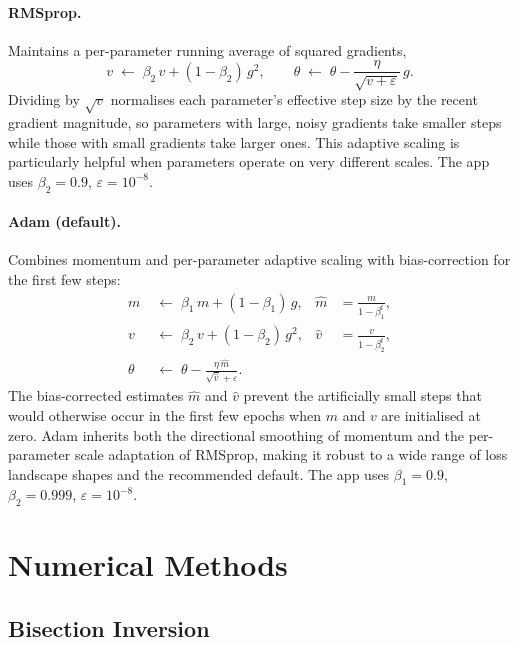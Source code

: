 \documentclass[11pt,a4paper]{article}
\newcommand{\param}{\theta}
\begin{document}
\paragraph{RMSprop.}
Maintains a per-parameter running average of squared gradients,
\begin{equation}
  v \;\leftarrow\; \beta_2\,v + (1-\beta_2)\,g^2,\qquad
  \param \;\leftarrow\; \param
         - \frac{\eta}{\sqrt{v+\varepsilon}}\,g.
\end{equation}
Dividing by $\sqrt{v}$ normalises each parameter's effective step size by
the recent gradient magnitude, so parameters with large, noisy gradients
take smaller steps while those with small gradients take larger ones.
This adaptive scaling is particularly helpful when parameters operate on
very different scales.  The app uses $\beta_2=0.9$, $\varepsilon=10^{-8}$.

\paragraph{Adam (default).}
Combines momentum and per-parameter adaptive scaling with
bias-correction for the first few steps:
\begin{align}
  m &\;\leftarrow\; \beta_1\,m + (1-\beta_1)\,g,&
  \hat m &= \frac{m}{1-\beta_1^t},\\
  v &\;\leftarrow\; \beta_2\,v + (1-\beta_2)\,g^2,&
  \hat v &= \frac{v}{1-\beta_2^t},\\
  \param &\;\leftarrow\; \param
         - \frac{\eta\,\hat m}{\sqrt{\hat v}+\varepsilon}.
\end{align}
The bias-corrected estimates $\hat m$ and $\hat v$ prevent the
artificially small steps that would otherwise occur in the first few
epochs when $m$ and $v$ are initialised at zero.  Adam inherits both the
directional smoothing of momentum and the per-parameter scale adaptation
of RMSprop, making it robust to a wide range of loss landscape shapes and
the recommended default.  The app uses $\beta_1=0.9$, $\beta_2=0.999$,
$\varepsilon=10^{-8}$.

\section{Numerical Methods}

\subsection{Bisection Inversion}
\label{sec:bisection}
\end{document}

